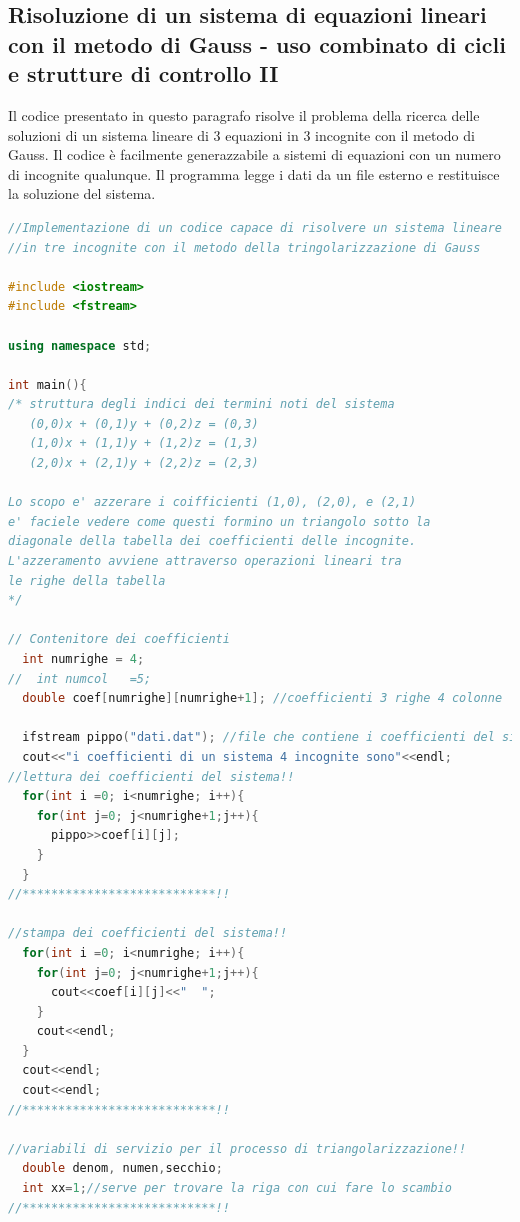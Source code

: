 \documentclass[11pt,fleqn]{book} %
\begin{document}
\subsection{Risoluzione di un sistema di equazioni lineari con il metodo di Gauss - uso combinato di cicli e strutture di controllo II}

Il codice presentato in questo paragrafo risolve il problema della ricerca delle soluzioni di un sistema lineare di 3 equazioni in 3 incognite con il metodo di Gauss. Il codice è facilmente generazzabile a sistemi di equazioni con un numero di incognite qualunque.
Il programma legge i dati da un file esterno e restituisce la soluzione del sistema.



\begin{lstlisting}[language=c++]
//Implementazione di un codice capace di risolvere un sistema lineare
//in tre incognite con il metodo della tringolarizzazione di Gauss

#include <iostream>
#include <fstream>

using namespace std;

int main(){
/* struttura degli indici dei termini noti del sistema
   (0,0)x + (0,1)y + (0,2)z = (0,3)
   (1,0)x + (1,1)y + (1,2)z = (1,3)
   (2,0)x + (2,1)y + (2,2)z = (2,3)

Lo scopo e' azzerare i coifficienti (1,0), (2,0), e (2,1)
e' faciele vedere come questi formino un triangolo sotto la 
diagonale della tabella dei coefficienti delle incognite.
L'azzeramento avviene attraverso operazioni lineari tra
le righe della tabella
*/

// Contenitore dei coefficienti
  int numrighe = 4;
//  int numcol   =5; 
  double coef[numrighe][numrighe+1]; //coefficienti 3 righe 4 colonne

  ifstream pippo("dati.dat"); //file che contiene i coefficienti del sistema
  cout<<"i coefficienti di un sistema 4 incognite sono"<<endl;
//lettura dei coefficienti del sistema!! 
  for(int i =0; i<numrighe; i++){
    for(int j=0; j<numrighe+1;j++){
      pippo>>coef[i][j];
    }
  }
//***************************!!

//stampa dei coefficienti del sistema!! 
  for(int i =0; i<numrighe; i++){
    for(int j=0; j<numrighe+1;j++){
      cout<<coef[i][j]<<"  ";
    }
    cout<<endl;
  }
  cout<<endl;
  cout<<endl;
//***************************!!

//variabili di servizio per il processo di triangolarizzazione!!
  double denom, numen,secchio;
  int xx=1;//serve per trovare la riga con cui fare lo scambio
//***************************!!



\end{lstlisting}
\end{document}
